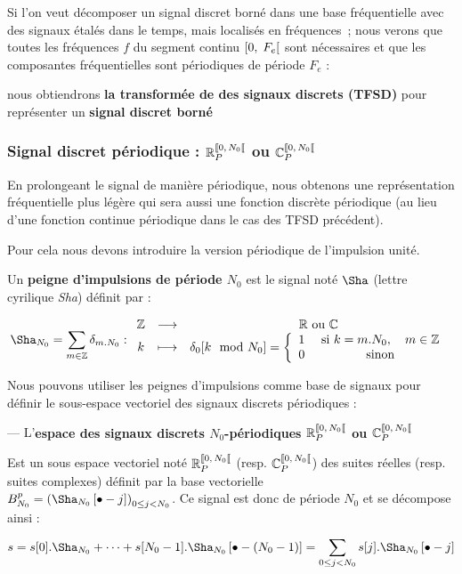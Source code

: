 \begin{remarque}
  Si l'on veut décomposer un signal discret borné dans une base
  fréquentielle avec des signaux étalés dans le temps, mais localisés
  en fréquences~; nous verons que toutes les fréquences $f$ du segment
  continu $\left[0,\;F_e\right[$ sont nécessaires et que les composantes
  fréquentielles sont périodiques de période $F_e$ :

  nous obtiendrons \textbf{la transformée de \Fourier{} des signaux
    discrets (TFSD)} pour représenter un \textbf{signal discret borné}
\end{remarque}


\subsubsection{Signal discret périodique : $\RNper$ ou $\CNper$}
En prolongeant le signal de manière périodique, nous obtenons une
représentation fréquentielle plus légère qui sera aussi une fonction
discrète périodique (au lieu d'une fonction continue périodique dans
le cas des TFSD précédent).

Pour cela nous devons introduire la version périodique de l'impulsion
unité.

\begin{definition}
  Un \textbf{peigne d'impulsions de période $N_0$} est le signal noté
  $\Sha$ (lettre cyrilique \emph{Sha}) définit par :
  
  \begin{equation*}
    \Sha_{N_0} = \sum\limits_{m\in\mathbb{Z}} \delta_{m.N_0}: \application{\Z}{\R \text{ ou } \C}{k}{\delta_0[k\mod{}N_0]=\pparMorceaux{1}{\text{ si } k = m.N_0,\quad m\in\Z}{0}{\text{ sinon}}}
  \end{equation*}

\end{definition}

Nous pouvons utiliser les peignes d'impulsions comme base de signaux
pour définir le sous-espace vectoriel des signaux discrets périodiques
:
\begin{definition}
  \label{def:signal_discret_periodique}
  --- L'\textbf{espace des signaux discrets $N_0$-périodiques
    $\RNper$ ou $\CNper$}

  Est un sous espace vectoriel noté $\RNper$ (resp. $\CNper$) des
  suites réelles (resp. suites complexes) définit par la base
  vectorielle \\$B_{N_0}^p=\left(\Sha_{N_0}\b{\bullet-j}\right)_{0\leq
    j<N_0}$. Ce signal est donc de période
  $N_0$ et se décompose ainsi :
  \begin{equation*}
    s = s[0].\Sha_{N_0} + \dots + s[N_0-1].\Sha_{N_0}\b{\bullet-(N_0-1)} = \somme{0\leq j< N_0}{}{s[j].\Sha_{N_0}\b{\bullet-j}}
  \end{equation*}
 
\end{definition}

